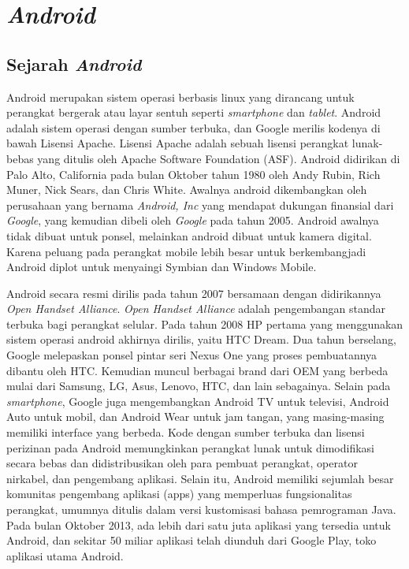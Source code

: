 \chapter{\textit{Android}}

\section{Sejarah \textit{Android}}
Android merupakan sistem operasi berbasis linux yang dirancang untuk perangkat bergerak atau layar sentuh seperti \textit{smartphone} dan \textit{tablet}. Android adalah sistem operasi dengan sumber terbuka, dan Google merilis kodenya di bawah Lisensi Apache. Lisensi Apache adalah sebuah lisensi perangkat lunak-bebas yang ditulis oleh Apache Software Foundation (ASF). Android didirikan di Palo Alto, California pada bulan Oktober tahun 1980 oleh Andy Rubin, Rich Muner, Nick Sears, dan Chris White. Awalnya android dikembangkan oleh perusahaan yang bernama \textit{Android, Inc} yang mendapat dukungan finansial dari \textit{Google}, yang kemudian dibeli oleh \textit{Google} pada tahun 2005. Android awalnya tidak dibuat untuk ponsel, melainkan android dibuat untuk kamera digital. Karena peluang pada perangkat mobile lebih besar untuk berkembangjadi Android diplot untuk menyaingi Symbian dan Windows Mobile.

Android secara resmi dirilis pada tahun 2007 bersamaan dengan didirikannya \textit{Open Handset Alliance}. \textit{Open Handset Alliance} adalah pengembangan standar terbuka bagi perangkat selular. Pada tahun 2008 HP pertama yang menggunakan sistem operasi android akhirnya dirilis, yaitu HTC Dream. Dua tahun berselang, Google melepaskan ponsel pintar seri Nexus One yang proses pembuatannya dibantu oleh HTC. Kemudian muncul berbagai brand dari OEM yang berbeda mulai dari Samsung, LG, Asus, Lenovo, HTC, dan lain sebagainya. Selain pada \textit{smartphone}, Google juga mengembangkan Android TV untuk televisi, Android Auto untuk mobil, dan Android Wear untuk jam tangan, yang masing-masing memiliki interface yang berbeda. Kode dengan sumber terbuka dan lisensi perizinan pada Android memungkinkan perangkat lunak untuk dimodifikasi secara bebas dan didistribusikan oleh para pembuat perangkat, operator nirkabel, dan pengembang aplikasi. Selain itu, Android memiliki sejumlah besar komunitas pengembang aplikasi (apps) yang memperluas fungsionalitas perangkat, umumnya ditulis dalam versi kustomisasi bahasa pemrograman Java. Pada bulan Oktober 2013, ada lebih dari satu juta aplikasi yang tersedia untuk Android, dan sekitar 50 miliar aplikasi telah diunduh dari Google Play, toko aplikasi utama Android.

